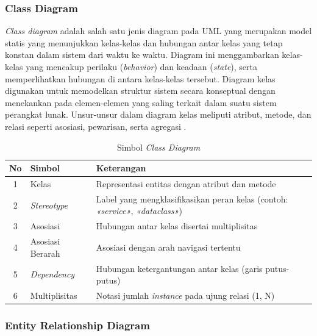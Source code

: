 \subsubsection{Class Diagram}\label{class-diagram}

\textit{Class diagram} adalah salah satu jenis diagram pada UML yang merupakan model statis yang menunjukkan kelas-kelas dan hubungan antar kelas yang tetap konstan dalam sistem dari waktu ke waktu. Diagram ini menggambarkan kelas-kelas yang mencakup perilaku (\textit{behavior}) dan keadaan (\textit{state}), serta memperlihatkan hubungan di antara kelas-kelas tersebut. Diagram kelas digunakan untuk memodelkan struktur sistem secara konseptual dengan menekankan pada elemen-elemen yang saling terkait dalam suatu sistem perangkat lunak. Unsur-unsur dalam diagram kelas meliputi atribut, metode, dan relasi seperti asosiasi, pewarisan, serta agregasi \cite{dennis2020systems}.

\begin{table}[H]
\centering
\caption{Simbol \textit{Class Diagram}}
\label{tab:simbol-class}
\begin{tabular}{|c|l|p{7cm}|}
\hline
\textbf{No} & \textbf{Simbol} & \textbf{Keterangan} \\
\hline
1 & Kelas & Representasi entitas dengan atribut dan metode \\
\hline
2 & \textit{Stereotype} & Label yang mengklasifikasikan peran kelas (contoh: \textit{«service»}, \textit{«dataclass»}) \\
\hline
3 & Asosiasi & Hubungan antar kelas disertai multiplisitas \\
\hline
4 & Asosiasi Berarah & Asosiasi dengan arah navigasi tertentu \\
\hline
5 & \textit{Dependency} & Hubungan ketergantungan antar kelas (garis putus-putus) \\
\hline
6 & Multiplisitas & Notasi jumlah \textit{instance} pada ujung relasi (1, N) \\
\hline
\end{tabular}
\end{table}

\subsubsection{Entity Relationship Diagram}\label{entity-relationship-diagram}

